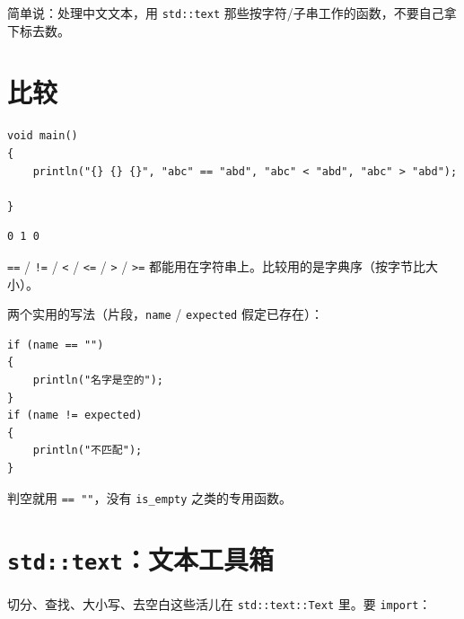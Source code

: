 简单说：处理中文文本，用 \texttt{std:\allowbreak{}:\allowbreak{}text} 那些按字符/子串工作的函数，不要自己拿下标去数。

\section{比较}

\par
\medskip
\begin{lstlisting}[style=chali]
void main()
{
    println("{} {} {}", "abc" == "abd", "abc" < "abd", "abc" > "abd");

}
\end{lstlisting}
\par
\medskip

\par
\medskip
\begin{lstlisting}[style=out]
0 1 0
\end{lstlisting}
\par
\medskip

\texttt{=\allowbreak{}=\allowbreak{}} / \texttt{!=\allowbreak{}} / \texttt{<\allowbreak{}} / \texttt{<\allowbreak{}=\allowbreak{}} / \texttt{>\allowbreak{}} / \texttt{>\allowbreak{}=\allowbreak{}} 都能用在字符串上。比较用的是字典序（按字节比大小）。

两个实用的写法（片段，\texttt{name} / \texttt{expected} 假定已存在）：

\par
\medskip
\begin{lstlisting}[style=chali]
if (name == "")
{
    println("名字是空的");
}
if (name != expected)
{
    println("不匹配");
}
\end{lstlisting}
\par
\medskip

判空就用 \texttt{=\allowbreak{}=\allowbreak{} ""}，没有 \texttt{is\_empty} 之类的专用函数。

\section{\texttt{std:\allowbreak{}:\allowbreak{}text}：文本工具箱}

切分、查找、大小写、去空白这些活儿在 \texttt{std:\allowbreak{}:\allowbreak{}text:\allowbreak{}:\allowbreak{}Text} 里。要 \texttt{import}：

